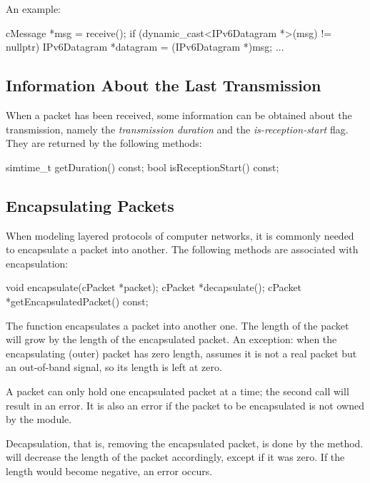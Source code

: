 An example:

\begin{cpp}
cMessage *msg = receive();
if (dynamic_cast<IPv6Datagram *>(msg) != nullptr) {
    IPv6Datagram *datagram = (IPv6Datagram *)msg;
    ...
}
\end{cpp}


\subsection{Information About the Last Transmission}
\label{sec:messages:information-about-last-transmission}

When a packet has been received, some information can be obtained
about the transmission, namely the \textit{transmission duration}
and the \textit{is-reception-start} flag. They are returned by
the following methods:

\begin{cpp}
simtime_t getDuration() const;
bool isReceptionStart() const;
\end{cpp}


\subsection{Encapsulating Packets}
\label{sec:messages:encapsulating-packets}

When modeling layered protocols of computer networks, it is commonly
needed to encapsulate a packet into another.
The following  methods are associated with encapsulation:

\begin{cpp}
void encapsulate(cPacket *packet);
cPacket *decapsulate();
cPacket *getEncapsulatedPacket() const;
\end{cpp}

The  function encapsulates a packet into another one.
The length of the packet will grow by the length of the encapsulated
packet. An exception: when the encapsulating (outer) packet has zero
length, {\opp} assumes it is not a real packet but an out-of-band signal,
so its length is left at zero.

A packet can only hold one encapsulated packet at a time; the second
 call will result in an error. It is also an error if
the packet to be encapsulated is not owned by the module.

Decapsulation, that is, removing the encapsulated packet, is done by the
 method.  will decrease the
length of the packet accordingly, except if it was zero. If the length
would become negative, an error occurs.

